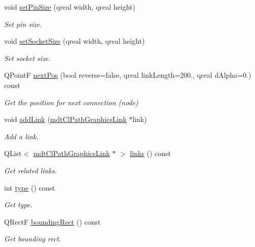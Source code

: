 \begin{DoxyCompactItemize}
void \hyperlink{classmdt_cl_path_graphics_connection_a1325b03e51a5dae59eb6b9648400ed4c}{set\-Pin\-Size} (qreal width, qreal height)
\begin{DoxyCompactList}\small\item\em Set pin size. \end{DoxyCompactList}\item 
void \hyperlink{classmdt_cl_path_graphics_connection_a1a134e11dbf748f77c5b65f04b1c2691}{set\-Socket\-Size} (qreal width, qreal height)
\begin{DoxyCompactList}\small\item\em Set socket size. \end{DoxyCompactList}\item 
Q\-Point\-F \hyperlink{classmdt_cl_path_graphics_connection_aa084c07837c090ba9984e79879bc4dd3}{next\-Pos} (bool reverse=false, qreal link\-Length=200., qreal d\-Alpha=0.) const 
\begin{DoxyCompactList}\small\item\em Get the position for next connection (node) \end{DoxyCompactList}\item 
void \hyperlink{classmdt_cl_path_graphics_connection_acbb4da1be19dcbf2a6127ed5b87c709e}{add\-Link} (\hyperlink{classmdt_cl_path_graphics_link}{mdt\-Cl\-Path\-Graphics\-Link} $\ast$link)
\begin{DoxyCompactList}\small\item\em Add a link. \end{DoxyCompactList}\item 
Q\-List$<$ \hyperlink{classmdt_cl_path_graphics_link}{mdt\-Cl\-Path\-Graphics\-Link} $\ast$ $>$ \hyperlink{classmdt_cl_path_graphics_connection_a83aaeb243bbc9a09a754d42a2c588693}{links} () const 
\begin{DoxyCompactList}\small\item\em Get related links. \end{DoxyCompactList}\item 
int \hyperlink{classmdt_cl_path_graphics_connection_aead86d183fdb2a686959f18574c6e9ef}{type} () const 
\begin{DoxyCompactList}\small\item\em Get type. \end{DoxyCompactList}\item 
Q\-Rect\-F \hyperlink{classmdt_cl_path_graphics_connection_ad8f37d152c86b5e003e4db98a708af68}{bounding\-Rect} () const 
\begin{DoxyCompactList}\small\item\em Get bounding rect. \end{DoxyCompactList}\item 

\end{DoxyCompactItemize}
